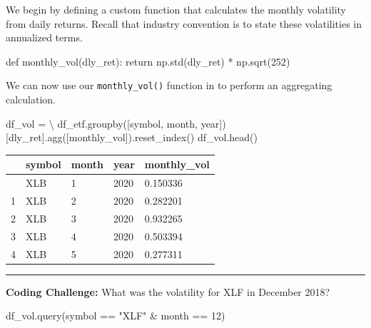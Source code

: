 \documentclass[
  letterpaper,
  DIV=11,
  numbers=noendperiod]{scrreprt}
\newenvironment{Shaded}{\begin{snugshade}}{\end{snugshade}}
\newcommand{\ControlFlowTok}[1]{\textcolor[rgb]{0.00,0.23,0.31}{#1}}
\newcommand{\DecValTok}[1]{\textcolor[rgb]{0.68,0.00,0.00}{#1}}
\newcommand{\KeywordTok}[1]{\textcolor[rgb]{0.00,0.23,0.31}{#1}}
\newcommand{\NormalTok}[1]{\textcolor[rgb]{0.00,0.23,0.31}{#1}}
\newcommand{\OperatorTok}[1]{\textcolor[rgb]{0.37,0.37,0.37}{#1}}
\newcommand{\StringTok}[1]{\textcolor[rgb]{0.13,0.47,0.30}{#1}}
\begin{document}
We begin by defining a custom function that calculates the monthly
volatility from daily returns. Recall that industry convention is to
state these volatilities in annualized terms.

\begin{Shaded}
\begin{Highlighting}[]
\KeywordTok{def}\NormalTok{ monthly\_vol(dly\_ret):}
    \ControlFlowTok{return}\NormalTok{ np.std(dly\_ret) }\OperatorTok{*}\NormalTok{ np.sqrt(}\DecValTok{252}\NormalTok{)}
\end{Highlighting}
\end{Shaded}

We can now use our \texttt{monthly\_vol()} function in to perform an
aggregating calculation.

\begin{Shaded}
\begin{Highlighting}[]
\NormalTok{df\_vol }\OperatorTok{=} \OperatorTok{\textbackslash{}}
\NormalTok{    df\_etf.groupby([}\StringTok{\textquotesingle{}symbol\textquotesingle{}}\NormalTok{, }\StringTok{\textquotesingle{}month\textquotesingle{}}\NormalTok{, }\StringTok{\textquotesingle{}year\textquotesingle{}}\NormalTok{])[}\StringTok{\textquotesingle{}dly\_ret\textquotesingle{}}\NormalTok{].agg([monthly\_vol]).reset\_index()}
\NormalTok{df\_vol.head()}
\end{Highlighting}
\end{Shaded}

\begin{longtable}[]{@{}lllll@{}}
\toprule\noalign{}
& symbol & month & year & monthly\_vol \\
\midrule\noalign{}
\endhead
\bottomrule\noalign{}
\endlastfoot
0 & XLB & 1 & 2020 & 0.150336 \\
1 & XLB & 2 & 2020 & 0.282201 \\
2 & XLB & 3 & 2020 & 0.932265 \\
3 & XLB & 4 & 2020 & 0.503394 \\
4 & XLB & 5 & 2020 & 0.277311 \\
\end{longtable}

\begin{center}\rule{0.5\linewidth}{0.5pt}\end{center}

\textbf{Coding Challenge:} What was the volatility for XLF in December
2018?

\begin{Shaded}
\begin{Highlighting}[]
\NormalTok{df\_vol.query(}\StringTok{\textquotesingle{}symbol == "XLF" \& month == 12\textquotesingle{}}\NormalTok{)}
\end{Highlighting}
\end{Shaded}
\end{document}
